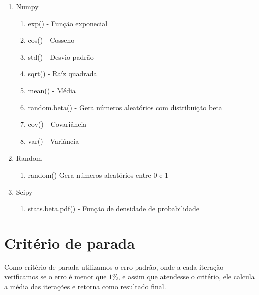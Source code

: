 \documentclass{article}
\begin{document}
\begin{enumerate}

    \item Numpy
    
        \begin{enumerate}
        
            \item exp() - Função exponecial 
            \item cos() - Cosseno
            \item std() - Desvio padrão
            \item sqrt() - Raíz quadrada
            \item mean() - Média
            \item random.beta() - Gera números aleatórios com distribuição beta
            \item cov() - Covariância
            \item var() - Variância
            
        \end{enumerate}
        
    \item Random
    
        \begin{enumerate}
        
            \item random() Gera números aleatórios entre 0 e 1
            
        \end{enumerate}
        
    \item Scipy
    
        \begin{enumerate}
        
            \item stats.beta.pdf() - Função de densidade de probabilidade
            
        \end{enumerate}
        
\end{enumerate}

\section{Critério de parada}
Como critério de parada utilizamos o erro padrão, onde a cada iteração verificamos se o erro é menor que $1\%
$, e assim que atendesse o critério, ele calcula a média das iterações e retorna como resultado final.
\end{document}
